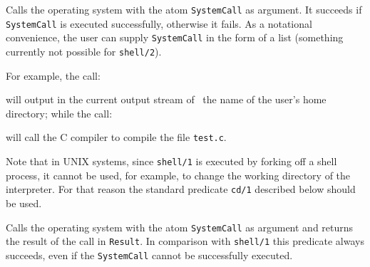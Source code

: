 \begin{description}
%

    Calls the operating system with the atom {\tt SystemCall} as argument.
    It succeeds if {\tt SystemCall} is executed successfully, otherwise it
    fails.  As a notational convenience, the user can supply {\tt SystemCall} 
    in the form of a list (something currently not possible for {\tt shell/2}).

    For example, the call:


    \noindent
    will output in the current output stream of \ourprolog\ the name of
    the user's home directory; while the call:


    \noindent
    will call the C compiler to compile the file {\tt test.c}.

    Note that in UNIX systems, since {\tt shell/1} is executed by
    forking off a shell process, it cannot be used, for example, to
    change the working directory of the interpreter.  For that reason
    the standard predicate {\tt cd/1} described below should be used.


    Calls the operating system with the atom {\tt SystemCall} as argument
    and returns the result of the call in {\tt Result}.  In comparison with
    {\tt shell/1} this predicate always succeeds, even if the {\tt SystemCall} 
    cannot be successfully executed.


\end{description}
